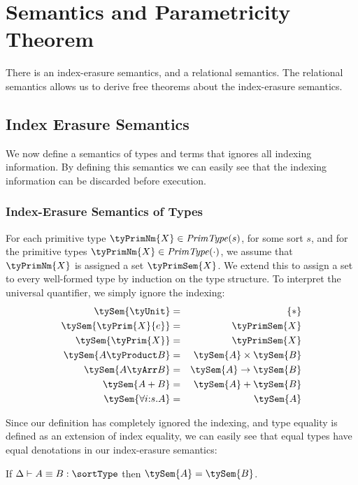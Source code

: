 \section{Semantics and Parametricity Theorem}

There is an index-erasure semantics, and a relational semantics. The
relational semantics allows us to derive free theorems about the
index-erasure semantics.

\subsection{Index Erasure Semantics}

We now define a semantics of types and terms that ignores all indexing
information. By defining this semantics we can easily see that the
indexing information can be discarded before execution.

\subsubsection{Index-Erasure Semantics of Types}

For each primitive type $\tyPrimNm{X} \in \mathit{PrimType}(s)$, for
some sort $s$, and for the primitive types $\tyPrimNm{X} \in
\mathit{PrimType}(\cdot)$, we assume that $\tyPrimNm{X}$ is assigned a
set $\tyPrimSem{X}$. We extend this to assign a set to every
well-formed type by induction on the type structure. To interpret the
universal quantifier, we simply ignore the indexing:
\begin{eqnarray*}
  \tySem{\tyUnit} & = & \{*\} \\
  \tySem{\tyPrim{X}{e}} & = & \tyPrimSem{X} \\
  \tySem{\tyPrim{X}} & = & \tyPrimSem{X} \\
  \tySem{A \tyProduct B} & = & \tySem{A} \times \tySem{B} \\
  \tySem{A \tyArr B} & = & \tySem{A} \to \tySem{B} \\
  \tySem{A + B} & = & \tySem{A} + \tySem{B} \\
  \tySem{\forall i\mathord:s. A} & = & \tySem{A}
\end{eqnarray*}

Since our definition has completely ignored the indexing, and type
equality is defined as an extension of index equality, we can easily
see that equal types have equal denotations in our index-erasure
semantics:
\begin{lemma}\label{lem:tyeq-erasure}
  If $\Delta \vdash A \equiv B : \sortType$ then $\tySem{A} =
  \tySem{B}$.
\end{lemma}

